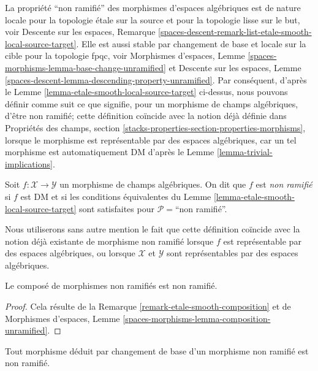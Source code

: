 \medskip\noindent
La propri\'et\'e ``non ramifi\'e'' des morphismes d'espaces alg\'ebriques est de
nature locale pour la topologie \'etale sur la source et pour la topologie lisse sur le but, voir
Descente sur les espaces, Remarque
\ref{spaces-descent-remark-list-etale-smooth-local-source-target}.
Elle est aussi stable par changement de base et locale sur la cible pour la
topologie fpqc, voir Morphismes d'espaces,
Lemme \ref{spaces-morphisms-lemma-base-change-unramified}
et
Descente sur les espaces,
Lemme \ref{spaces-descent-lemma-descending-property-unramified}.
Par cons\'equent, d'apr\`es le
Lemme \ref{lemma-etale-smooth-local-source-target}
ci-dessus, nous pouvons d\'efinir comme suit ce que signifie, pour un morphisme
de champs alg\'ebriques, d'\^etre non ramifi\'e; cette d\'efinition co\"incide avec
la notion d\'ej\`a d\'efinie dans Propri\'et\'es des champs, section
\ref{stacks-properties-section-properties-morphisms},
lorsque le morphisme est repr\'esentable par des espaces alg\'ebriques,
car un tel morphisme est automatiquement DM d'apr\`es le
Lemme \ref{lemma-trivial-implications}.

\begin{definition}
\label{definition-unramified}
Soit $f : \mathcal{X} \to \mathcal{Y}$ un morphisme de champs alg\'ebriques.
On dit que $f$ est {\it non ramifi\'e} si $f$ est DM et si les conditions
\'equivalentes du Lemme \ref{lemma-etale-smooth-local-source-target}
sont satisfaites pour $\mathcal{P} =$``non ramifi\'e''.
\end{definition}

\noindent
Nous utiliserons sans autre mention le fait que cette d\'efinition co\"incide
avec la notion d\'ej\`a existante de morphisme non ramifi\'e lorsque $f$ est
repr\'esentable par des espaces alg\'ebriques, ou lorsque $\mathcal{X}$ et
$\mathcal{Y}$ sont repr\'esentables par des espaces alg\'ebriques.

\begin{lemma}
\label{lemma-composition-unramified}
Le compos\'e de morphismes non ramifi\'es est non ramifi\'e.
\end{lemma}

\begin{proof}
Cela r\'esulte de la Remarque \ref{remark-etale-smooth-composition}
et de
Morphismes d'espaces, Lemme \ref{spaces-morphisms-lemma-composition-unramified}.
\end{proof}

\begin{lemma}
\label{lemma-base-change-unramified}
Tout morphisme d\'eduit par changement de base d'un morphisme non ramifi\'e est non ramifi\'e.
\end{lemma}

